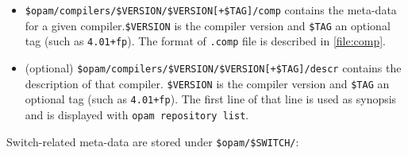 \documentclass[a4paper,10pt]{article}
\begin{document}
\begin{itemize}

\item \verb|$opam/compilers/$VERSION/$VERSION[+$TAG]/comp| contains the meta-data
  for a given compiler.\verb+$VERSION+ is the compiler version and
  \verb+$TAG+ an optional tag (such as \verb|4.01+fp|).
  The format of {\tt .comp} file is described in \ref{file:comp}.

\item (optional) \verb|$opam/compilers/$VERSION/$VERSION[+$TAG]/descr|
  contains the description of that compiler. \verb+$VERSION+ is the
  compiler version and \verb+$TAG+ an optional tag (such as
  \verb|4.01+fp|). The first line of that line is used as synopsis and
  is displayed with {\tt opam repository list}.

\end{itemize}

Switch-related meta-data are stored under \verb+$opam/$SWITCH/+:
\end{document}
